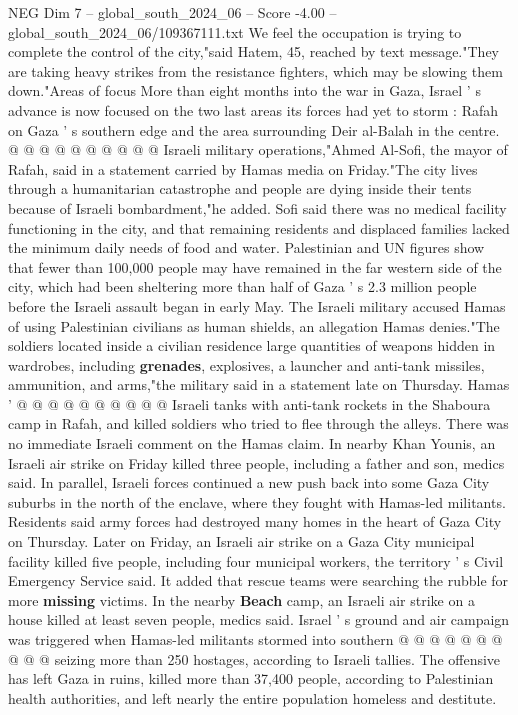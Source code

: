\begin{textsample}{NEG Dim 7 – global\_south\_2024\_06 – Score -4.00 – global\_south\_2024\_06/109367111.txt}
We feel the occupation is trying to complete the control of the city,"said Hatem, 45, reached by text message."They are taking heavy strikes from the resistance fighters, which may be slowing them down."Areas of focus More than eight months into the war in Gaza, Israel ' s advance is now focused on the two last areas its forces had yet to storm : Rafah on Gaza ' s southern edge and the area surrounding Deir al-Balah in the centre. @ @ @ @ @ @ @ @ @ @ Israeli military operations,"Ahmed Al-Sofi, the mayor of Rafah, said in a statement carried by Hamas media on Friday."The city lives through a humanitarian catastrophe and people are dying inside their tents because of Israeli bombardment,"he added.
Sofi said there was no medical facility functioning in the city, and that remaining residents and displaced families lacked the minimum daily needs of food and water.
Palestinian and UN figures show that fewer than 100,000 people may have remained in the far western side of the city, which had been sheltering more than half of Gaza ' s 2.3 million people before the Israeli assault began in early May.
The Israeli military accused Hamas of using Palestinian civilians as human shields, an allegation Hamas denies."The soldiers located inside a civilian residence large quantities of weapons hidden in wardrobes, including \textbf{grenades}, explosives, a launcher and anti-tank missiles, ammunition, and arms,"the military said in a statement late on Thursday.
Hamas ' @ @ @ @ @ @ @ @ @ @ Israeli tanks with anti-tank rockets in the Shaboura camp in Rafah, and killed soldiers who tried to flee through the alleys.
There was no immediate Israeli comment on the Hamas claim.
In nearby Khan Younis, an Israeli air strike on Friday killed three people, including a father and son, medics said.
In parallel, Israeli forces continued a new push back into some Gaza City suburbs in the north of the enclave, where they fought with Hamas-led militants.
Residents said army forces had destroyed many homes in the heart of Gaza City on Thursday.
Later on Friday, an Israeli air strike on a Gaza City municipal facility killed five people, including four municipal workers, the territory ' s Civil Emergency Service said.
It added that rescue teams were searching the rubble for more \textbf{missing} victims.
In the nearby \textbf{Beach} camp, an Israeli air strike on a house killed at least seven people, medics said.
Israel ' s ground and air campaign was triggered when Hamas-led militants stormed into southern @ @ @ @ @ @ @ @ @ @ seizing more than 250 hostages, according to Israeli tallies.
The offensive has left Gaza in ruins, killed more than 37,400 people, according to Palestinian health authorities, and left nearly the entire population homeless and destitute.

\end{textsample}
